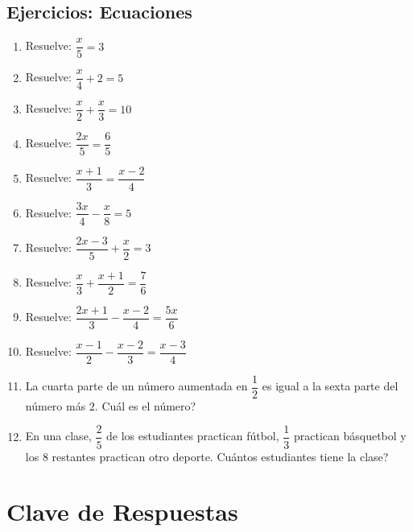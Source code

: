 \documentclass[12pt, letterpaper]{article}
\begin{document}
\subsection{Ejercicios: Ecuaciones}

\begin{enumerate}[leftmargin=*]
  \item \facil{} Resuelve: $\dfrac{x}{5} = 3$

  \item \facil{} Resuelve: $\dfrac{x}{4} + 2 = 5$

  \item \facil{} Resuelve: $\dfrac{x}{2} + \dfrac{x}{3} = 10$

  \item \facil{} Resuelve: $\dfrac{2x}{5} = \dfrac{6}{5}$

  \item \medio{} Resuelve: $\dfrac{x + 1}{3} = \dfrac{x - 2}{4}$

  \item \medio{} Resuelve: $\dfrac{3x}{4} - \dfrac{x}{8} = 5$

  \item \medio{} Resuelve: $\dfrac{2x - 3}{5} + \dfrac{x}{2} = 3$

  \item \medio{} Resuelve: $\dfrac{x}{3} + \dfrac{x + 1}{2} = \dfrac{7}{6}$

  \item \medio{} Resuelve: $\dfrac{2x + 1}{3} - \dfrac{x - 2}{4} = \dfrac{5x}{6}$

  \item \dificil{} Resuelve: $\dfrac{x - 1}{2} - \dfrac{x - 2}{3} = \dfrac{x - 3}{4}$

  \item \dificil{} La cuarta parte de un número aumentada en $\dfrac{1}{2}$ es igual a la sexta parte del número más $2$. \textquestiondown Cuál es el número?

  \item \dificil{} En una clase, $\dfrac{2}{5}$ de los estudiantes practican fútbol, $\dfrac{1}{3}$ practican básquetbol y los $8$ restantes practican otro deporte. \textquestiondown Cuántos estudiantes tiene la clase?
\end{enumerate}

\newpage

\ifmwclaves
  \section{Clave de Respuestas}
\end{document}
